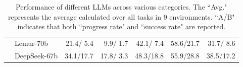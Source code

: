 \begin{table}[t!]
{\begin{tabular}{@{}cl*{5}{d{4.4}}@{}}
 & Lemur-70b  & 21.4/ \phantom{1} 5.4 & 9.9/ \phantom{1} 1.7 & 42.1/ \phantom{1} 7.4 & 58.6/21.7 &  31.7/ \phantom{1} 8.6 \\ 

  & DeepSeek-67b  & 34.1/17.7 & 17.8/ \phantom{1} 3.3 & 48.3/18.8 & 55.9/28.8 &  38.5/17.2 \\ 
 
 \bottomrule
 \end{tabular}}
 
\caption{Performance of different LLMs across various categories. The ``Avg." represents the average calculated over all tasks in 9 environments. ``A/B" indicates that both ``progress rate" and ``success rate" are reported.}
\label{tab: results of different categories}
\end{table}